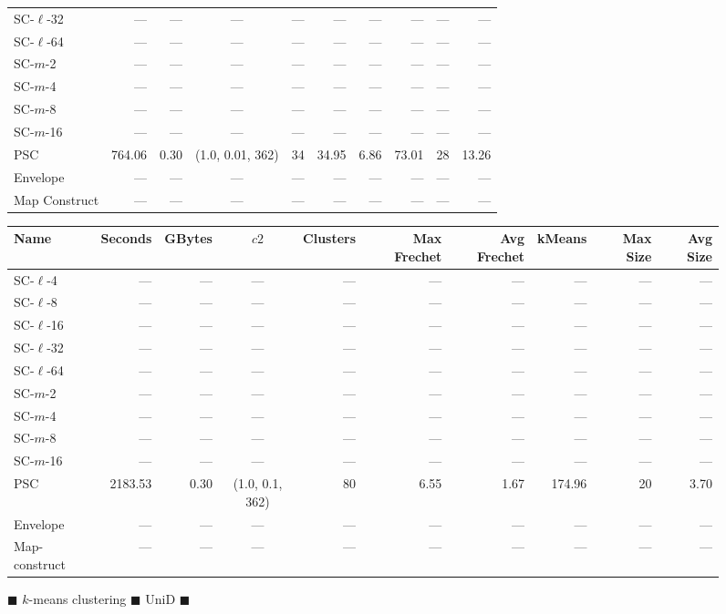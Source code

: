 \documentclass[11pt]{article}
\begin{document}
\begin{figure}
\begin{center}
\begin{minipage}{\textwidth}
{\begin{tabular}{@{}lrrcrrrrrr@{}}
SC-$\ell$-32 & --- & --- & --- & --- & --- & --- & --- & --- & ---\\
SC-$\ell$-64 & --- & --- & --- & --- & --- & --- & --- & --- & ---\\
SC-$m$-2 & --- & --- & --- & --- & --- & --- & --- & --- & ---\\
SC-$m$-4 & --- & --- & --- & --- & --- & --- & --- & --- & ---\\
SC-$m$-8 & --- & --- & --- & --- & --- & --- & --- & --- & ---\\
SC-$m$-16 & --- & --- & --- & --- & --- & --- & --- & --- & ---\\
PSC & 764.06 & 0.30 & (1.0, 0.01, 362) & 34 & 34.95 & 6.86 & 73.01 & 28 & 13.26\\
Envelope & --- & --- & --- & --- & --- & --- & --- & --- & ---\\
Map Construct & --- & --- & --- & --- & --- & --- & --- & --- & ---\\
        \bottomrule
    \end{tabular}
    }
    {
    \begin{tabular}{@{}lrrcrrrrrr@{}}
        \toprule
        Name & Seconds & GBytes & $c2$ & Clusters & Max Frechet & Avg Frechet & kMeans & Max Size & Avg Size\\
        \midrule
        SC-$\ell$-4 & --- & --- & --- & --- & --- & --- & --- & --- & ---\\
SC-$\ell$-8 & --- & --- & --- & --- & --- & --- & --- & --- & ---\\
SC-$\ell$-16 & --- & --- & --- & --- & --- & --- & --- & --- & ---\\
SC-$\ell$-32 & --- & --- & --- & --- & --- & --- & --- & --- & ---\\
SC-$\ell$-64 & --- & --- & --- & --- & --- & --- & --- & --- & ---\\
SC-$m$-2 & --- & --- & --- & --- & --- & --- & --- & --- & ---\\
SC-$m$-4 & --- & --- & --- & --- & --- & --- & --- & --- & ---\\
SC-$m$-8 & --- & --- & --- & --- & --- & --- & --- & --- & ---\\
SC-$m$-16 & --- & --- & --- & --- & --- & --- & --- & --- & ---\\
PSC & 2183.53 & 0.30 & (1.0, 0.1, 362) & 80 & 6.55 & 1.67 & 174.96 & 20 & 3.70\\
Envelope & --- & --- & --- & --- & --- & --- & --- & --- & ---\\
Map-construct & --- & --- & --- & --- & --- & --- & --- & --- & ---\\
        \bottomrule
    \end{tabular}
    }
\end{minipage}
\end{center}
        \caption{$\blacksquare$ $k$-means clustering $\blacksquare$ UniD $\blacksquare$}
 \end{figure}
\end{document}
